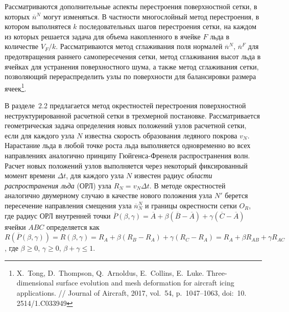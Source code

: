 \documentclass[a4paper,14pt]{extarticle}                     %
\theoremstyle{plain}                                         %
\begin{document}
Рассматриваются дополнительные аспекты перестроения поверхностной сетки, в которых $\overline{n}^N$ могут изменяться.
В частности многослойный метод перестроения, в котором выполнятеся $k$ последовательных шагов перестроения сетки, на каждом из которых решается задача для объема накопленного в ячейке $F$ льда в количестве $V_F/k$.
Рассматриваются метод сглаживания поля нормалей $\overline{n}^N$, $\overline{n}^F$ для предотвращения раннего самопересечения сетки, метод сглаживания высот льда в ячейках для устранения поверхностного шума, а также метод сглаживания сетки, позволяющий перераспределить узлы по поверхности для балансировки размера ячеек\footnote[3]{X.~Tong, D.~Thompson, Q.~Arnoldus, E.~Collins, E.~Luke. Three-dimensional surface evolution and mesh deformation for aircraft icing applications. // Journal of Aircraft, 2017, vol.~54, p.~1047–1063, doi:~10.
2514/1.C033949}.


В разделе~2.2 предлагается метод окрестностей перестроения поверхностной неструктурированной расчетной сетки в трехмерной постановке.
Рассматривается геометрическая задача определения новых положений узлов расчетной сетки, если для каждого узла $N$ известна скорость образования ледяного покрова $v_N$.
Нарастание льда в любой точке роста льда выполняется одновременно во всех направлениях аналогично принципу Гюйгенса-Френеля распространения волн.
Расчет новых положений узлов выполняется через некоторый фиксированный момент времени $\Delta t$, для каждого узла $N$ известен радиус \textit{области распространения льда} (ОРЛ) узла $R_N = v_N \Delta t$.
В методе окрестностей аналогично двумерному случаю в качестве нового положения узла $N'$ берется пересечение направления смещения узла $\overline{n}_N^N$ и границы окрестности сетки $O_R$, где
радиус ОРЛ внутренней точки $\overline{P}(\beta, \gamma) = \overline{A} + \beta (\overline{B} - \overline{A}) + \gamma (\overline{C} - \overline{A})$ ячейки $ABC$ определяется как $R(\overline{P}(\beta,\gamma)) = R(\beta,\gamma) = R_A + \beta(R_B - R_A) + \gamma(R_C - R_A) = R_A + \beta R_{AB} + \gamma R_{AC}$, где $\beta \ge 0$, $\gamma \ge 0$, $\beta + \gamma \le 1$.
\end{document}
